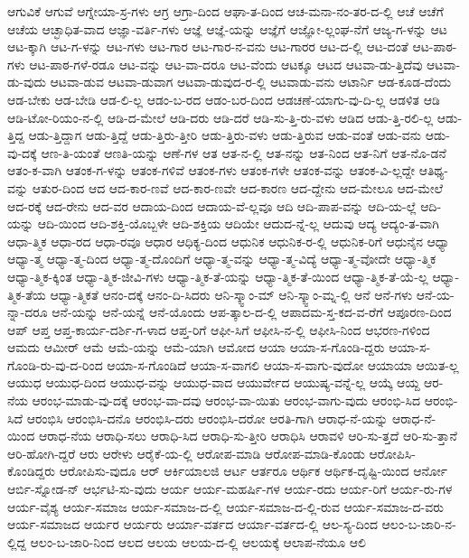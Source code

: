 {ಆಗುವಿಕೆ
ಆಗುವೆ
ಆಗ್ನೇಯಾ-ಸ್ರ-ಗಳು
ಆಗ್ರ
ಆಗ್ರಾ-ದಿಂದ
ಆಘಾ-ತ-ದಿಂದ
ಆಚ-ಮನಾ-ನಂ-ತರ-ದ-ಲ್ಲಿ
ಆಚೆ
ಆಚೆಗೆ
ಆಚೆಯ
ಆಚ್ಛಾಧಿತ-ವಾದ
ಆಜ್ಞಾ-ವರ್ತಿ-ಗಳು
ಆಜ್ಞೆ
ಆಜ್ಞೆ-ಯನ್ನು
ಆಜ್ಞೆಗೆ
ಆಜ್ಞೋ-ಲ್ಲಂಘ-ನೆಗೆ
ಆಜ್ಯ-ಗ-ಳನ್ನು
ಆಟ
ಆಟ-ಕ್ಕಾಗಿ
ಆಟ-ಗ-ಳನ್ನು
ಆಟ-ಗಳು
ಆಟ-ಗಾರ
ಆಟ-ಗಾರ-ನ-ವನು
ಆಟ-ಗಾರರ
ಆಟ-ದ-ಲ್ಲಿ
ಆಟ-ದಂತೆ
ಆಟ-ಪಾಠ-ಗಳು
ಆಟ-ಪಾಠ-ಗಳೆ-ರಡೂ
ಆಟ-ವನ್ನು
ಆಟ-ವಾ-ದರೂ
ಆಟ-ವೆಂದು
ಆಟಕ್ಕೂ
ಆಟದ
ಆಟವಾ-ಡು-ತ್ತಿದೆವು
ಆಟವಾ-ಡು-ವುದು
ಆಟವಾ-ಡುವ
ಆಟವಾ-ಡುವಾಗ
ಆಟವಾ-ಡುವುದ-ರ-ಲ್ಲಿ
ಆಟವಾಡು-ವನು
ಆಟಾರ್ನಿ
ಆಡ-ಕೂಡ-ದೆಂದು
ಆಡ-ಬೇಕು
ಆಡ-ಬೇಡಿ
ಆಡ-ಲಿ-ಲ್ಲ
ಆಡಂ-ಬ-ರದ
ಆಡಂ-ಬರ-ದಿಂದ
ಆಡಚಣೆ-ಯಾಗು-ವು-ದಿ-ಲ್ಲ
ಆಡಳಿತ
ಆಡಿ
ಆಡಿ-ಟೋ-ರಿಯಂ-ನ-ಲ್ಲಿ
ಆಡಿ-ದ-ಮೇಲೆ
ಆಡಿ-ದರು
ಆಡಿ-ದರೆ
ಆಡಿ-ಸು-ತ್ತಿ-ರು-ವಳು
ಆಡಿದ
ಆಡು-ತ್ತಿ-ರಲಿ-ಲ್ಲ
ಆಡು-ತ್ತಿದ್ದ
ಆಡು-ತ್ತಿದ್ದಾಗ
ಆಡು-ತ್ತಿದ್ದೆ
ಆಡು-ತ್ತಿರು-ತ್ತೀರಿ
ಆಡು-ತ್ತಿರು-ವಳು
ಆಡು-ತ್ತಿರುವ
ಆಡು-ವಂತೆ
ಆಡು-ವನು
ಆಡು-ವು-ದಕ್ಕೆ
ಆಣ-ತಿ-ಯಂತೆ
ಆಣತಿ-ಯನ್ನು
ಆಣೆ-ಗಳ
ಆತ
ಆತ-ನ-ಲ್ಲಿ
ಆತ-ನನ್ನು
ಆತ-ನಿಂದ
ಆತ-ನಿಗೆ
ಆತ-ನೊ-ಡನೆ
ಆತಂ-ಕ-ವಾಗಿ
ಆತಂಕ-ಗ-ಳನ್ನು
ಆತಂಕ-ಗಳಿವೆ
ಆತಂಕ-ಗಳು
ಆತಂಕ-ಗಳೇ
ಆತಂಕ-ವನ್ನು
ಆತಂಕ-ವಿ-ಲ್ಲದ್ದೇ
ಆತಿಥ್ಯ-ವನ್ನು
ಆತುರ-ದಿಂದ
ಆದ
ಆದ-ಕಾರ-ಣವೆ
ಆದ-ಕಾರ-ಣವೇ
ಆದ-ಕಾರಣ
ಆದ-ದ್ದೇನು
ಆದ-ಮೇಲೂ
ಆದ-ಮೇಲೆ
ಆದ-ರಕ್ಕೆ
ಆದ-ರೇನು
ಆದ-ವರ
ಆದಾಯ-ದಿಂದ
ಆದಾಯ-ವೆ-ಲ್ಲವೂ
ಆದಿ
ಆದಿ-ಪಾಪ-ವನ್ನು
ಆದಿ-ಯ-ಲ್ಲೆ
ಆದಿ-ಯನ್ನು
ಆದಿ-ಯಿಂದ
ಆದಿ-ಶಕ್ತಿ-ಯೊಬ್ಬಳೇ
ಆದಿ-ಶಕ್ತಿಯ
ಆದಿಯೇ
ಆದುದ-ನ್ನೆ-ಲ್ಲ
ಆದುವು
ಆದ್ಯ
ಆದ್ಯಂ-ತ-ವಾಗಿ
ಆಧಾ-ತ್ಮಿಕ
ಆಧಾ-ರದ
ಆಧಾ-ರವೂ
ಆಧಾರ
ಆಧಿಕ್ಯ-ದಿಂದ
ಆಧುನಿಕ
ಆಧುನಿಕ-ರ-ಲ್ಲಿ
ಆಧುನಿಕ-ರಿಗೆ
ಆಧುನೈನ
ಆಧ್ಯಾ
ಆಧ್ಯಾ-ತ್ಮ
ಆಧ್ಯಾ-ತ್ಮ-ದಿಂದ
ಆಧ್ಯಾ-ತ್ಮ-ದೊಂದಿಗೆ
ಆಧ್ಯಾ-ತ್ಮ-ವನ್ನು
ಆಧ್ಯಾ-ತ್ಮ-ವಿದ್ಯೆ
ಆಧ್ಯಾ-ತ್ಮ-ವೋದೇ
ಆಧ್ಯಾ-ತ್ಮಿಕ
ಆಧ್ಯಾ-ತ್ಮಿಕ-ಕ್ಕಿಂತ
ಆಧ್ಯಾ-ತ್ಮಿಕ-ಜೀವಿ-ಗಳು
ಆಧ್ಯಾ-ತ್ಮಿಕ-ತೆ-ಯನ್ನು
ಆಧ್ಯಾ-ತ್ಮಿಕ-ತೆ-ಯಿಂದ
ಆಧ್ಯಾ-ತ್ಮಿಕ-ತೆ-ಯೆ-ಲ್ಲ
ಆಧ್ಯಾ-ತ್ಮಿಕ-ತೆಯ
ಆಧ್ಯಾ-ತ್ಮಿಕತೆ
ಆನಂ-ದಕ್ಕೆ
ಆನಂ-ದಿ-ಸಿದರು
ಆನಿ-ಸ್ಕ್ವಾಂ-ಮ್
ಆನಿ-ಸ್ಕ್ವಾಂ-ಮ್ನ-ಲ್ಲಿ
ಆನೆ
ಆನೆ-ಗಳು
ಆನೆ-ಯ-ನ್ನಾ-ದರೂ
ಆನೆ-ಯನ್ನು
ಆನೆ-ಯನ್ನೆ
ಆನೆ-ಯೊಂದು
ಆಪ-ತ್ಕಾಲ-ದ-ಲ್ಲಿ
ಆಪಾದಮ-ಸ್ತ-ಕದ-ವ-ರೆಗೆ
ಆಪೂರಣ-ದಿಂದ
ಆಪ್
ಆಪ್ತ
ಆಪ್ತ-ಕಾರ್ಯ-ದರ್ಶಿ-ಗ-ಳಾದ
ಆಪ್ತ-ರಿಗೆ
ಆಫೀ-ಸಿಗೆ
ಆಫೀಸಿ-ನ-ಲ್ಲಿ
ಆಫೀಸಿ-ನಿಂದ
ಆಭರಣ-ಗಳಿಂದ
ಆಮದು
ಆಮೀರ್
ಆಮೆ
ಆಮೆ-ಯನ್ನು
ಆಮೆ-ಯಾಗಿ
ಆಮೋದ
ಆಯಾ
ಆಯಾ-ಸ-ಗೊಂಡಿ-ದ್ದರು
ಆಯಾ-ಸ-ಗೊಂಡಿ-ರು-ವು-ದ-ರಿಂದ
ಆಯಾ-ಸ-ಗೊಂಡಿದೆ
ಆಯಾ-ಸ-ವಾಗಲಿ
ಆಯಾ-ಸ-ವಾಗು-ವುದೋ
ಆಯಾಯಾ
ಆಯಿತ-ಲ್ಲ
ಆಯುಧ
ಆಯುಧ-ದಿಂದ
ಆಯುಧ-ವನ್ನು
ಆಯುಧ-ವಾದ
ಆಯುರ್ವೇದ
ಆಯುಷ್ಯ-ವನ್ನೆ-ಲ್ಲ
ಆಯ್ಕೆ
ಆಯ್ದ
ಆರ-ನೆಯ
ಆರಂಭ-ಮಾಡು-ವು-ದಕ್ಕೆ
ಆರಂಭ-ವಾ-ದವು
ಆರಂಭ-ವಾ-ಯಿತು
ಆರಂಭ-ವಾಗು-ವುದು
ಆರಂಭಿ-ಸಿದ
ಆರಂಭಿ-ಸಿದೆ
ಆರಂಭಿಸಿ
ಆರಂಭಿಸಿ-ದನೊ
ಆರಂಭಿಸಿ-ದರು
ಆರಂಭಿಸಿ-ದರೋ
ಆರತಿ-ಗಾಗಿ
ಆರಾಧ-ನೆ-ಯನ್ನು
ಆರಾಧ-ನೆ-ಯಿಂದ
ಆರಾಧ-ನೆಯ
ಆರಾಧಿ-ಸಲು
ಆರಾಧಿ-ಸಿದ
ಆರಾಧಿ-ಸು-ತ್ತೀರಿ
ಆರಾಧಿಸಿ
ಆರಾವಳಿ
ಆರಿ-ಸು-ತ್ತದೆ
ಆರಿ-ಸು-ತ್ತಾನೆ
ಆರಿ-ಹೋಗಿ-ದ್ದರೆ
ಆರು
ಆರೇಳು
ಆರೈಕೆ-ಯ-ಲ್ಲಿ
ಆರೋಪ-ಮಾಡಿ
ಆರೋಪ-ಮಾಡಿ-ಕೊಂಡು
ಆರೋಪಿಸಿ-ಕೊಂಡಿದ್ದರು
ಆರೋಪಿಸು-ವುದೂ
ಆರ್
ಆರ್ಕಿಯಾಲಜಿ
ಆರ್ಟ
ಆರ್ತರೂ
ಆರ್ಥಿಕ
ಆರ್ಥಿಕ-ದೃಷ್ಟಿ-ಯಿಂದ
ಆರ್ನೋ
ಆರ್ಬಿ-ಸ್ನೋಡ-ನ್
ಆರ್ಭಟಿ-ಸು-ವುದು
ಆರ್ಯ
ಆರ್ಯ-ಮಹರ್ಷಿ-ಗಳ
ಆರ್ಯ-ರದು
ಆರ್ಯ-ರಿಗೆ
ಆರ್ಯ-ರು-ಗಳ
ಆರ್ಯ-ವೈಶ್ಯ
ಆರ್ಯ-ಸಮಾಜ
ಆರ್ಯ-ಸಮಾಜ-ದ-ಲ್ಲಿ
ಆರ್ಯ-ಸಮಾಜ-ದ-ಲ್ಲಿ-ರುವ
ಆರ್ಯ-ಸಮಾಜ-ದ-ವರು
ಆರ್ಯ-ಸಮಾಜದ
ಆರ್ಯರ
ಆರ್ಯರು
ಆರ್ಯಾ-ವರ್ತದ
ಆರ್ಯಾ-ವರ್ತದ-ಲ್ಲಿ
ಆಲ-ಸ್ಯ-ದಿಂದ
ಆಲಂ-ಬ-ಜಾರಿ-ನ-ಲ್ಲಿದ್ದ
ಆಲಂ-ಬ-ಜಾರಿ-ನಿಂದ
ಆಲದ
ಆಲಯ
ಆಲಯ-ದ-ಲ್ಲಿ
ಆಲಯಕ್ಕೆ
ಆಲಾಪ-ನೆಯೂ
ಆಲಿ
}
